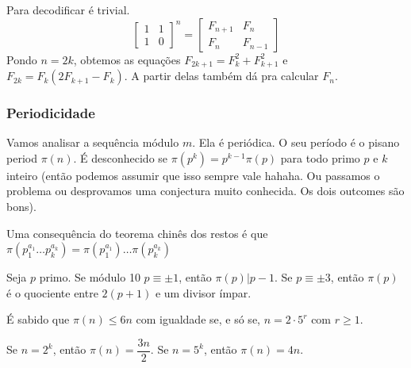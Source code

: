 Para decodificar é trivial.
$$ \begin{bmatrix}
1 & 1 \\
1 & 0
\end{bmatrix}^n = 
\begin{bmatrix}
F_{n+1} & F_n \\
F_n & F_{n-1}
\end{bmatrix}
$$
Pondo $n = 2k$, obtemos as equações $F_{2k+1} = F_k^2 + F_{k+1}^2$ e $F_{2k} = F_k(2F_{k+1} - F_k)$. A partir delas também dá pra calcular $F_n$.

\subsubsection{Periodicidade}

Vamos analisar a sequência módulo $m$. Ela é periódica. O seu período é o pisano period $\pi(n)$. É desconhecido se $\pi(p^k) = p^{k-1} \pi(p)$ para todo primo $p$ e $k$ inteiro (então podemos assumir que isso sempre vale hahaha. Ou passamos o problema ou desprovamos uma conjectura muito conhecida. Os dois outcomes são bons). 

Uma consequência do teorema chinês dos restos é que $\pi( p_1^{a_1} \dots p_k^{a_k}) = \pi(p_1^{a_1}) \dots \pi(p_k^{a_k})$

Seja $p$ primo. Se módulo 10 $p \equiv \pm1$, então $\pi(p) | p-1$. Se $p \equiv \pm 3$, então $\pi(p)$ é o quociente entre $2(p+1)$ e um divisor ímpar.

É sabido que $\pi(n) \leq 6n$ com igualdade se, e só se, $n = 2 \cdot 5^r$ com $r \geq 1$. 

Se $n=2^k$, então $\pi(n) = \dfrac{3n}{2}$. Se $n=5^k$, então $\pi(n) = 4n$.

